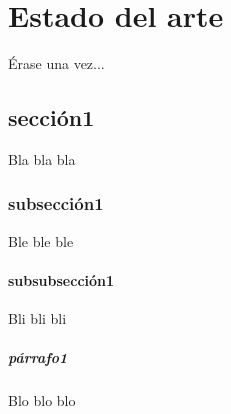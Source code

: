 	\chapter{Estado del arte}\label{cap.estadoDelArte}
	
	Érase una vez...
	\section{sección1}
	Bla bla bla
	\subsection{subsección1}
	Ble ble ble
	\subsubsection{subsubsección1}
	Bli bli bli
	\paragraph{párrafo1}
	Blo blo blo



	\newpage
	$\ $